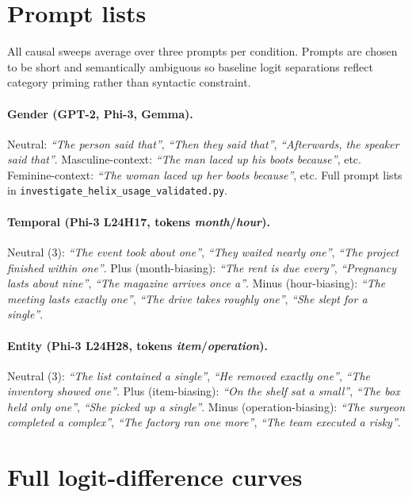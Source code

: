 \section{Prompt lists}
\label{app:prompts}

All causal sweeps average over three prompts per condition. Prompts are
chosen to be short and semantically ambiguous so baseline logit
separations reflect category priming rather than syntactic constraint.

\paragraph{Gender (GPT-2, Phi-3, Gemma).}
Neutral: \emph{``The person said that''}, \emph{``Then they said that''},
\emph{``Afterwards, the speaker said that''}.
Masculine-context: \emph{``The man laced up his boots because''}, etc.
Feminine-context: \emph{``The woman laced up her boots because''}, etc.
Full prompt lists in \texttt{investigate\_helix\_usage\_validated.py}.

\paragraph{Temporal (Phi-3 L24H17, tokens \emph{month}/\emph{hour}).}
Neutral (3): \emph{``The event took about one''},
\emph{``They waited nearly one''},
\emph{``The project finished within one''}.
Plus (month-biasing): \emph{``The rent is due every''},
\emph{``Pregnancy lasts about nine''},
\emph{``The magazine arrives once a''}.
Minus (hour-biasing): \emph{``The meeting lasts exactly one''},
\emph{``The drive takes roughly one''},
\emph{``She slept for a single''}.

\paragraph{Entity (Phi-3 L24H28, tokens \emph{item}/\emph{operation}).}
Neutral (3): \emph{``The list contained a single''},
\emph{``He removed exactly one''},
\emph{``The inventory showed one''}.
Plus (item-biasing): \emph{``On the shelf sat a small''},
\emph{``The box held only one''},
\emph{``She picked up a single''}.
Minus (operation-biasing): \emph{``The surgeon completed a complex''},
\emph{``The factory ran one more''},
\emph{``The team executed a risky''}.

\section{Full logit-difference curves}
\label{app:curves}

